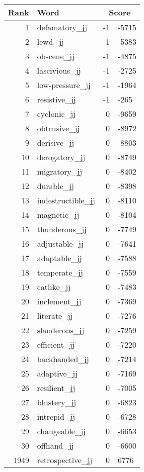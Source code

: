 \begin{longtable}[!htbp]{| rlr@{.}l |}
    \hline
    \textbf{Rank} & \textbf{Word} & \multicolumn{2}{c|}{\textbf{Score}} \\
    \hline
    \endhead
    1 & defamatory\_jj & -1 & -5715 \\
    2 & lewd\_jj & -1 & -5383 \\
    3 & obscene\_jj & -1 & -4875 \\
    4 & lascivious\_jj & -1 & -2725 \\
    5 & low-pressure\_jj & -1 & -1964 \\
    6 & resistive\_jj & -1 & -265 \\
    7 & cyclonic\_jj & 0 & -9659 \\
    8 & obtrusive\_jj & 0 & -8972 \\
    9 & derisive\_jj & 0 & -8803 \\
    10 & derogatory\_jj & 0 & -8749 \\
    11 & migratory\_jj & 0 & -8402 \\
    12 & durable\_jj & 0 & -8398 \\
    13 & indestructible\_jj & 0 & -8110 \\
    14 & magnetic\_jj & 0 & -8104 \\
    15 & thunderous\_jj & 0 & -7749 \\
    16 & adjustable\_jj & 0 & -7641 \\
    17 & adaptable\_jj & 0 & -7588 \\
    18 & temperate\_jj & 0 & -7559 \\
    19 & catlike\_jj & 0 & -7483 \\
    20 & inclement\_jj & 0 & -7369 \\
    21 & literate\_jj & 0 & -7276 \\
    22 & slanderous\_jj & 0 & -7259 \\
    23 & efficient\_jj & 0 & -7220 \\
    24 & backhanded\_jj & 0 & -7214 \\
    25 & adaptive\_jj & 0 & -7169 \\
    26 & resilient\_jj & 0 & -7005 \\
    27 & blustery\_jj & 0 & -6823 \\
    28 & intrepid\_jj & 0 & -6728 \\
    29 & changeable\_jj & 0 & -6653 \\
    30 & offhand\_jj & 0 & -6600 \\
    1949 & retrospective\_jj & 0 & 6776 \\

\end{longtable}
